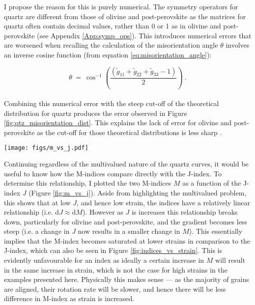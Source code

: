 \documentclass[a4paper,12pt,twoside]{report}
\numberwithin{equation}{chapter}
\begin{document}
I propose the reason for this is purely numerical. The symmetry operators for quartz are different from those of olivine and post-perovskite as the matrices for quartz often contain decimal values, rather than 0 or 1 as in olivine and post-perovskite (see Appendix \ref{App:symp_ops}). This introduces numerical errors that are worsened when recalling the calculation of the misorientation angle $\theta$ involves an inverse cosine function (from equation \ref{eq:misorientation_angle}):   

\begin{equation}
\theta\ =\ \cos^{-1}\left( \frac{(\tilde{g}_{11} + \tilde{g}_{22} + \tilde{g}_{33} - 1)}{2} \right)\ .
\end{equation}
\\
Combining this numerical error with the steep cut-off of the theoretical distribution for quartz produces the error observed in Figure \ref{fig:qtz_misorientation_dist}. This explains the lack of error for olivine and post-perovskite as the cut-off for those theoretical distributions is less sharp \citep[see Figure \ref{fig:misorientation_example}, or][for more distributions]{Wheeler2001}.

\begin{figure*}[p]
  \centering
    \texttt{[image: figs/m\_vs\_j.pdf]}
  \caption[Relationship of M- and J-indices]{M-index (continuous and discrete) as a function of J-index. \textbf{Top row} shows olivine, \textbf{middle row} shows quartz and \textbf{bottom row} shows post-perovskite, with the \textbf{left column} showing data from axial compression VPSC models and the \textbf{right column} data from simple shear. Calculations used $n$ = 5,000 grains.} 
  \label{fig:m_vs_j}
\end{figure*} 
  
Continuing regardless of the multivalued nature of the quartz curves, it would be useful to know how the M-indices compare directly with the J-index. To determine this relationship, I plotted the two M-indices $M$ as a function of the J-index $J$ (Figure \ref{fig:m_vs_j}). Aside from highlighting the multivalued problem, this shows that at low $J$, and hence low strain, the indices have a relatively linear relationship (i.e. $\mathrm{d}J \approx \mathrm{d}M$). However as $J$ is increases this relationship breaks down, particularly for olivine and post-perovskite, and the gradient becomes less steep (i.e. a change in $J$ now results in a smaller change in $M$). This essentially implies that the M-index becomes saturated at lower strains in comparison to the J-index, which can also be seen in Figure \ref{fig:indices_vs_strain}. This is evidently unfavourable for an index as ideally a certain increase in $M$ will result in the same increase in strain, which is not the case for high strains in the examples presented here. Physically this makes sense --- as the majority of grains are aligned, their rotation rate will be slower, and hence there will be less difference in M-index as strain is increased.  
\end{document}
